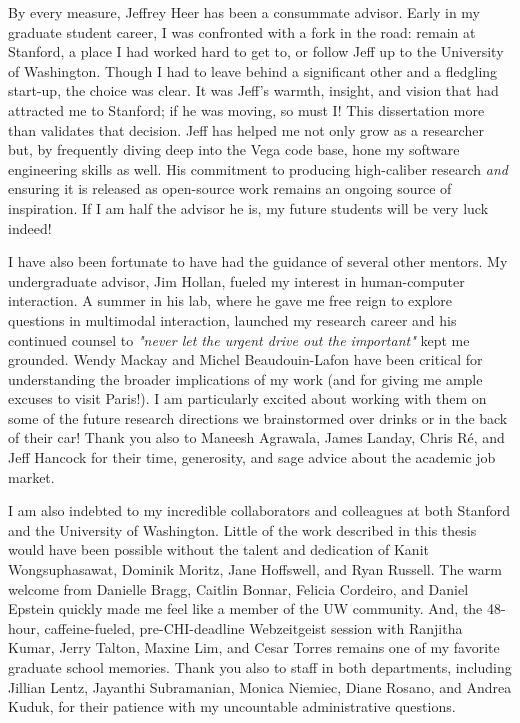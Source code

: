 \label{sec:acknowledgements}

By every measure, Jeffrey Heer has been a consummate advisor. Early in my
graduate student career, I was confronted with a fork in the road: remain at
Stanford, a place I had worked hard to get to, or follow Jeff up to the
University of Washington. Though I had to leave behind a significant other and a
fledgling start-up, the choice was clear. It was Jeff's warmth, insight, and
vision that had attracted me to Stanford; if he was moving, so must I! This
dissertation more than validates that decision. Jeff has helped me not only grow
as a researcher but, by frequently diving deep into the Vega code base, hone my
software engineering skills as well. His commitment to producing high-caliber
research \emph{and} ensuring it is released as open-source work remains an
ongoing source of inspiration. If I am half the advisor he is, my future
students will be very luck indeed!

I have also been fortunate to have had the guidance of several other mentors. My
undergraduate advisor, Jim Hollan, fueled my interest in human-computer
interaction. A summer in his lab, where he gave me free reign to explore
questions in multimodal interaction, launched my research career and his
continued counsel to \emph{"never let the urgent drive out the important"} kept
me grounded. Wendy Mackay and Michel Beaudouin-Lafon have been critical for
understanding the broader implications of my work (and for giving me ample
excuses to visit Paris!). I am particularly excited about working with them on
some of the future research directions we brainstormed over drinks or in the
back of their car! Thank you also to Maneesh Agrawala, James Landay, Chris
R\'{e}, and Jeff Hancock for their time, generosity, and sage advice about the
academic job market.

I am also indebted to my incredible collaborators and colleagues at both
Stanford and the University of Washington. Little of the work described in this
thesis would have been possible without the talent and dedication of Kanit
Wongsuphasawat, Dominik Moritz, Jane Hoffswell, and Ryan Russell. The warm
welcome from Danielle Bragg, Caitlin Bonnar, Felicia Cordeiro, and Daniel
Epstein quickly made me feel like a member of the UW community. And, the
48-hour, caffeine-fueled, pre-CHI-deadline Webzeitgeist session with Ranjitha
Kumar, Jerry Talton, Maxine Lim, and Cesar Torres remains one of my favorite
graduate school memories. Thank you also to staff in both departments, including
Jillian Lentz, Jayanthi Subramanian, Monica Niemiec, Diane Rosano, and Andrea
Kuduk, for their patience with my uncountable administrative questions.

